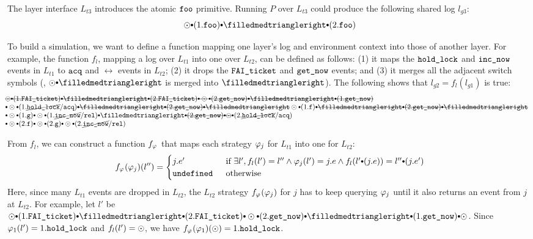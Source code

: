 The layer interface $L_{t3}$ introduces the atomic ${\texttt{foo}}$
primitive. Running $P$ over $L_{t3}$ could produce the following shared log
$l_{g3}$:
\[
\ssame \cons (1.\comm{foo})
\cons \sdiff \cons (2.\comm{foo})
\]

To build a simulation, we want to define a function mapping one
layer's log and environment context into those of another layer.  For
example, the function $f_l$, mapping a log over $L_{t1}$ into one over
$L_{t2}$, can be defined as follows: (1) it maps the ${\texttt{hold\_lock}}$ and
${\texttt{inc\_now}}$ events in $L_{t1}$ to ${\texttt{acq}}$ and $\rel$ events in $L_{t2}$; (2) it
drops the ${\texttt{FAI\_ticket}}$ and ${\texttt{get\_now}}$ events; 
and (3) it merges all the adjacent switch symbols (\eg,
$\ssame \cons \sdiff$ is merged into $\sdiff$).
The following shows that $l_{g2} = f_l (l_{g1})$ is true:
\[
\begin{array}{l}
\hspace*{-1em}\mysout
{\ssame \cons (1.\incticket) \cons
\sdiff \cons (2.\incticket) \cons
\ssame \cons (2.\getnow) \cons
\sdiff \cons (1.\getnow)
}\\
\hspace*{-1em} \cons\ssame \cons (1.\cancel{\holdlock}/\acq) 
\mysout
{\cons 
\sdiff \cons (2.\getnow) \cons
\sdiff 
} 
\ssame \cons (1.\comm{f}) \cons
\mysout
{\sdiff \cons (2.\getnow) \cons
\sdiff
}
\\
\hspace*{-1em}
\cons \ssame \cons (1.\comm{g}) \cons
\ssame \cons (1.\cancel{\incnow}/\rel) 
\cons \sdiff 
\mysout
{\cons (2.\getnow) \cons
\ssame 
}
\cons (2.\cancel{\holdlock}/\acq) 
\\
\hspace*{-1em}
\cons
\ssame \cons (2.\comm{f}) \cons
\ssame \cons (2.\comm{g}) \cons
\ssame \cons (2.\cancel{\incnow}/\rel) 
\end{array}
\]

From $f_l$, we can construct a function $f_{\varphi_{}}$
that maps each strategy $\varphi_{j}$ for $L_{t1}$ into one for $L_{t2}$:
\[ 
f_{\strat{}}(\strat{j}) (l'')=
\begin{cases}
j.e' & \text{if } 
\exists l', f_l(l') = l'' \wedge \strat{j}(l') = j.e
\wedge f_l(l'\cons(j.e)) = l'' \cons (j.e') \\
\comm{undefined } & \text{otherwise}
\end{cases}
\]
Here, since many $L_{t1}$ events are dropped in $L_{t2}$,
the $L_{t2}$ strategy $f_{\varphi_{}}(\varphi_{j})$ for $j$
has to keep querying $\varphi_{j}$ until
it also returns an event from $j$ at $L_{t2}$.  For example, let $l'$ be
$\ssame \cons (1.\incticket) \cons \sdiff \cons (2.\incticket) \cons
\ssame \cons (2.\getnow) \cons \sdiff \cons (1.\getnow) \cons \ssame$.
Since $\varphi_{1} (l') = 1.{\texttt{hold\_lock}}$ and $f_l(l') = \odot$, we have
$f_{\varphi_{}}(\varphi_{1}) (\odot) =1.{\texttt{hold\_lock}}$.

